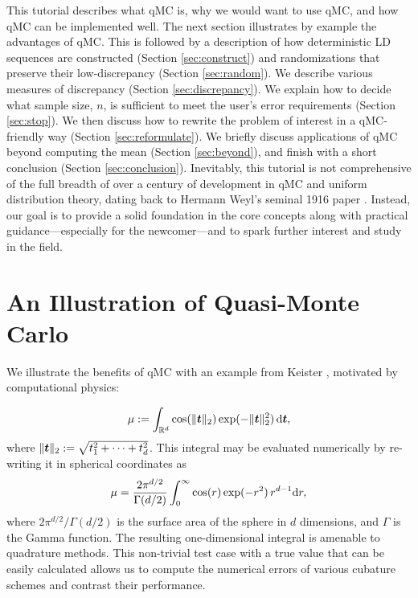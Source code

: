 \documentclass{svproc}
\begin{document}
This tutorial describes what qMC is, why we would want to use qMC, and how qMC can be implemented well.  The next section illustrates by example the advantages of qMC.  This is followed by a description of how deterministic LD sequences are constructed (Section \ref{sec:construct}) and randomizations that preserve their low-discrepancy (Section \ref{sec:random}).  We describe various measures of discrepancy (Section \ref{sec:discrepancy}).  We explain how to decide what sample size, $n$, is sufficient to meet the user's error requirements (Section \ref{sec:stop}).  We then discuss how to rewrite the problem of interest in a qMC-friendly way (Section \ref{sec:reformulate}). We briefly discuss applications of qMC beyond computing the mean (Section \ref{sec:beyond}), and finish with a short conclusion (Section \ref{sec:conclusion}). Inevitably, this tutorial is not comprehensive of the full breadth of over a century of development in qMC and uniform distribution theory, dating back to Hermann Weyl's seminal 1916 paper \cite{Wey16}. Instead, our goal is to provide a solid foundation in the core concepts along with practical guidance---especially for the newcomer---and to spark further interest and study in the field.


%
\section{An Illustration of Quasi-Monte Carlo} \label{sec:practice}

We illustrate the benefits of qMC with an example from Keister \cite{Kei96}, motivated by computational physics:

\begin{equation}\label{eq:keisterA}
	\mu := \int_{\mathbb{R}^d} \cos(\lVert {\boldsymbol{t}} \rVert_2) \exp(-\lVert {\boldsymbol{t}} \rVert_2^2) \, {\mathrm{d}} {\boldsymbol{t}},
\end{equation}
where $\lVert {\boldsymbol{t}} \rVert_2 := \sqrt{t_1^2 + \cdots + t_d^2}$.  This integral may be evaluated numerically by re-writing it in spherical coordinates as
\begin{equation}\label{eq:keisterExact}
	\mu = \frac{2 \pi^{d/2}}{\Gamma(d/2)}\int_{0}^{\infty} \cos(r) \exp(-r^2) \, r^{d-1} {\mathrm{d}} r,
\end{equation}
where $2 \pi^{d/2}/\Gamma(d/2)$ is the surface area of the sphere in $d$ dimensions, and $\Gamma$ is the Gamma function.  The resulting one-dimensional integral is amenable to quadrature methods.  This non-trivial test case with a true value that can be easily calculated allows us to compute the numerical errors of various cubature schemes and contrast their performance.
\end{document}
